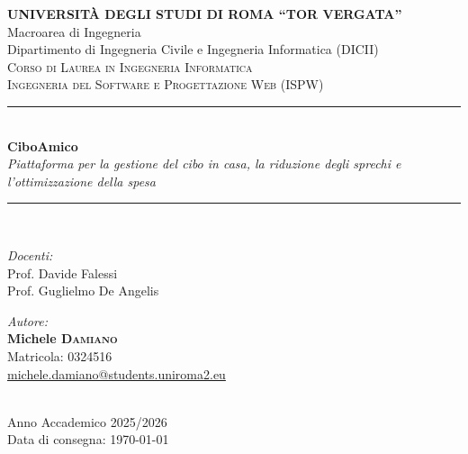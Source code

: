 \documentclass[12pt,a4paper,oneside]{report}
\begin{document}
\begin{titlepage}
    \centering
    \large
    \textbf{UNIVERSITÀ DEGLI STUDI DI ROMA ``TOR VERGATA''} \\[0.3cm]
    \large Macroarea di Ingegneria \\
    Dipartimento di Ingegneria Civile e Ingegneria Informatica (DICII) \\[1.2cm]

    \scshape\Large Corso di Laurea in Ingegneria Informatica \\[0.3cm]
    \large Ingegneria del Software e Progettazione Web (ISPW) \\[1.5cm]

    \rule{\linewidth}{0.4mm} \\[0.4cm]
    {\huge\bfseries CiboAmico} \\[0.3cm]
    \large\itshape Piattaforma per la gestione del cibo in casa, la riduzione degli sprechi e l'ottimizzazione della spesa \\
    \rule{\linewidth}{0.4mm} \\[1.5cm]

    \begin{minipage}{0.5\textwidth}
        \begin{flushleft} \large
            \emph{Docenti:} \\
            Prof. Davide Falessi \\
            Prof. Guglielmo De Angelis
        \end{flushleft}
    \end{minipage}
    \hfill
    \begin{minipage}{0.42\textwidth}
        \begin{flushright} \large
            \emph{Autore:} \\
            \textbf{Michele \textsc{Damiano}} \\
            Matricola: 0324516 \\
            \href{mailto:michele.damiano@students.uniroma2.eu}{\small michele.damiano@students.uniroma2.eu}
        \end{flushright}
    \end{minipage} \\[2.5cm]

    \vfill
    {\large Anno Accademico 2025/2026} \\[0.2cm]
    {\large Data di consegna: \today}
\end{titlepage}

\end{document}
